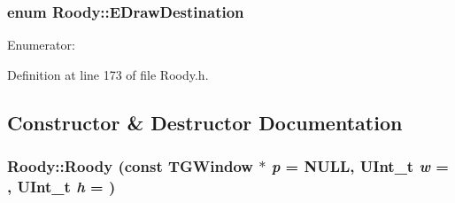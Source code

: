 \subsubsection[{EDrawDestination}]{\setlength{\rightskip}{0pt plus 5cm}enum {\bf Roody::EDrawDestination}\hspace{0.3cm}{\ttfamily  [protected]}}\label{classRoody_adc82e0265971335ba2a7e88a1f36ef21}
\begin{Desc}
\item[Enumerator: ]\par
\begin{description}
\item[{\em 
D\_\-PLOT\_\-DEFAULT\label{classRoody_adc82e0265971335ba2a7e88a1f36ef21aaab32d0ee521d1abd1ecc6aa907eece7}
}]\item[{\em 
D\_\-PLOT\_\-NEW\label{classRoody_adc82e0265971335ba2a7e88a1f36ef21a724c013a65921e1e083c3abc1f3b0cb9}
}]\item[{\em 
D\_\-PLOT\_\-SAME\label{classRoody_adc82e0265971335ba2a7e88a1f36ef21a432f1770f5630286dc842b6adcb36494}
}]\item[{\em 
D\_\-PLOT\_\-REPLACE\label{classRoody_adc82e0265971335ba2a7e88a1f36ef21acf7ad8739940023a3eb1d7adaf920d6b}
}]\item[{\em 
D\_\-PLOT\_\-NEXT\label{classRoody_adc82e0265971335ba2a7e88a1f36ef21accc671086ee62332fd66579bab1babf6}
}]\end{description}
\end{Desc}



Definition at line 173 of file Roody.h.

\subsection{Constructor \& Destructor Documentation}
\subsubsection[{Roody}]{\setlength{\rightskip}{0pt plus 5cm}Roody::Roody (const TGWindow $\ast$ {\em p} = {\ttfamily NULL}, \/  UInt\_\-t {\em w} = {}, \/  UInt\_\-t {\em h} = {})}\label{classRoody_ad83246f782ed3b8fc2a0170abceb1814}


